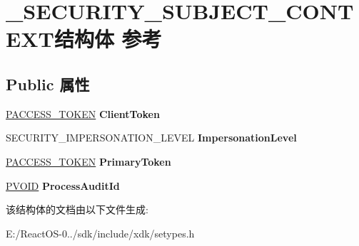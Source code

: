 \hypertarget{struct___s_e_c_u_r_i_t_y___s_u_b_j_e_c_t___c_o_n_t_e_x_t}{}\section{\+\_\+\+S\+E\+C\+U\+R\+I\+T\+Y\+\_\+\+S\+U\+B\+J\+E\+C\+T\+\_\+\+C\+O\+N\+T\+E\+X\+T结构体 参考}
\label{struct___s_e_c_u_r_i_t_y___s_u_b_j_e_c_t___c_o_n_t_e_x_t}
\subsection*{Public 属性}
\begin{DoxyCompactItemize}
\item 
\mbox{\label{struct___s_e_c_u_r_i_t_y___s_u_b_j_e_c_t___c_o_n_t_e_x_t_a53a0eb5729d32300ec7a01a431bd9781}} 
\hyperlink{interfacevoid}{P\+A\+C\+C\+E\+S\+S\+\_\+\+T\+O\+K\+EN} {\bfseries Client\+Token}
\item 
\mbox{\label{struct___s_e_c_u_r_i_t_y___s_u_b_j_e_c_t___c_o_n_t_e_x_t_a3497d9db7ed5b142f2763cc8a54a451f}} 
S\+E\+C\+U\+R\+I\+T\+Y\+\_\+\+I\+M\+P\+E\+R\+S\+O\+N\+A\+T\+I\+O\+N\+\_\+\+L\+E\+V\+EL {\bfseries Impersonation\+Level}
\item 
\mbox{\label{struct___s_e_c_u_r_i_t_y___s_u_b_j_e_c_t___c_o_n_t_e_x_t_a7d2cf3f100cb0575a3aa22c8cd7f28b2}} 
\hyperlink{interfacevoid}{P\+A\+C\+C\+E\+S\+S\+\_\+\+T\+O\+K\+EN} {\bfseries Primary\+Token}
\item 
\mbox{\label{struct___s_e_c_u_r_i_t_y___s_u_b_j_e_c_t___c_o_n_t_e_x_t_af71292a76ec75ebc4ab5c369f1d7c61c}} 
\hyperlink{interfacevoid}{P\+V\+O\+ID} {\bfseries Process\+Audit\+Id}
\end{DoxyCompactItemize}


该结构体的文档由以下文件生成\+:\begin{DoxyCompactItemize}
\item 
E\+:/\+React\+O\+S-\/0../sdk/include/xdk/setypes.\+h\end{DoxyCompactItemize}
